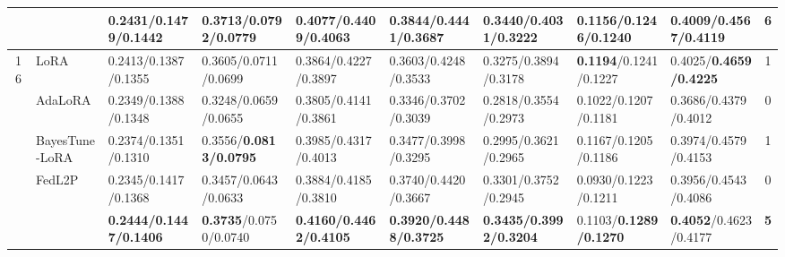 \begin{table*}[t]
\begin{scriptsize}
{\begin{tabular}{c|l|l|l|l|l|l|l|l|c}
                    & \method{}                                 & \textbf{0.2431/0.1479/0.1442}    & \textbf{0.3713/0.0792/0.0779}    & \textbf{0.4077/0.4409/0.4063}    & \textbf{0.3844/0.4441/0.3687}    & \textbf{0.3440/0.4031/0.3222}     & \textbf{0.1156}/0.1246/\textbf{0.1240}     & \textbf{0.4009}/0.4567/0.4119                                & \textbf{6}    \\ \hline
\multirow{5}{*}{16} & LoRA                                   & 0.2413/0.1387/0.1355             & 0.3605/0.0711/0.0699             & 0.3864/0.4227/0.3897             & 0.3603/0.4248/0.3533             & 0.3275/0.3894/0.3178             & \textbf{0.1194}/0.1241/0.1227    & 0.4025/\textbf{0.4659/0.4225}                                         & 1             \\ %
                    & AdaLoRA                              & 0.2349/0.1388/0.1348             & 0.3248/0.0659/0.0655             & 0.3805/0.4141/0.3861             & 0.3346/0.3702/0.3039             & 0.2818/0.3554/0.2973             & 0.1022/0.1207/0.1181             & 0.3686/0.4379/0.4012                                         & 0             \\ %
                    & BayesTune-LoRA                            & 0.2374/0.1351/0.1310              & 0.3556/\textbf{0.0813/0.0795}             & 0.3985/0.4317/0.4013             & 0.3477/0.3998/0.3295             & 0.2995/0.3621/0.2965             & 0.1167/0.1205/0.1186             & 0.3974/0.4579/0.4153                                         & 1             \\ %
                    & FedL2P                               & 0.2345/0.1417/0.1368             & 0.3457/0.0643/0.0633             & 0.3884/0.4185/0.3810              & 0.3740/0.4420/0.3667               & 0.3301/0.3752/0.2945             & 0.0930/0.1223/0.1211              & 0.3956/0.4543/0.4086                                         & 0             \\ %
                    & \method{}                                 & \textbf{0.2444/0.1447/0.1406}    & \textbf{0.3735}/0.0750/0.0740      & \textbf{0.4160/0.4462/0.4105}     & \textbf{0.3920/0.4488/0.3725}     & \textbf{0.3435/0.3992/0.3204}    & 0.1103/\textbf{0.1289/0.1270}              & \textbf{0.4052}/0.4623/0.4177                                & \textbf{5}    \\ \bottomrule
\end{tabular}
}
\end{scriptsize}
\vspace{-1.5em}
\end{table*}